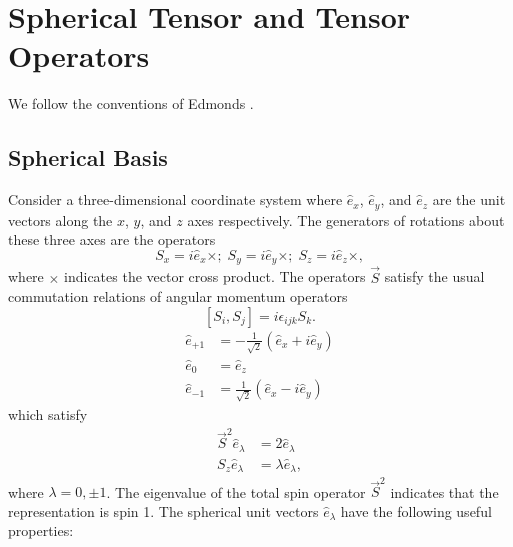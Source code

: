 \documentclass{book}[letterpaper,12pt]
\begin{document}
\chapter{Spherical Tensor and Tensor Operators}
\thispagestyle{headings}
We follow the conventions of Edmonds \cite{edmonds1996angular}. 
\section{Spherical Basis}
Consider a three-dimensional coordinate system where $\hat{e}_x$, $\hat{e}_y$, and $\hat{e}_z$ are the unit vectors along the $x$, $y$, and $z$ axes respectively. The generators of rotations about these three axes are the operators 
\begin{equation}
S_x=i\hat{e}_x\times;\;S_y=i\hat{e}_y\times;\;S_z=i\hat{e}_z\times,
\end{equation}
where $\times$ indicates the vector cross product. The operators $\vec{S}$ satisfy the usual commutation relations of angular momentum operators
\begin{equation}
\left[S_i,S_j\right]=i\epsilon_{ijk}S_k.
\end{equation}
\begin{equation}
\begin{split}
\hat{e}_{+1}&=-\frac{1}{\sqrt{2}}\left(\hat{e}_x+i\hat{e}_y\right)\\
\hat{e}_0&=\hat{e}_z\\
\hat{e}_{-1}&=\frac{1}{\sqrt{2}}\left(\hat{e}_x-i\hat{e}_y\right)
\end{split}
\end{equation}
which satisfy
\begin{equation}
\begin{split}
\vec{S}^2\hat{e}_\lambda&=2\hat{e}_\lambda\\
S_z\hat{e}_\lambda&=\lambda\hat{e}_\lambda,
\end{split}
\end{equation}
where $\lambda=0,\pm 1$. The eigenvalue of the total spin operator $\vec{S}^2$ indicates that the representation is spin 1. The spherical unit vectors $\hat{e}_\lambda$ have the following useful properties:
\end{document}
